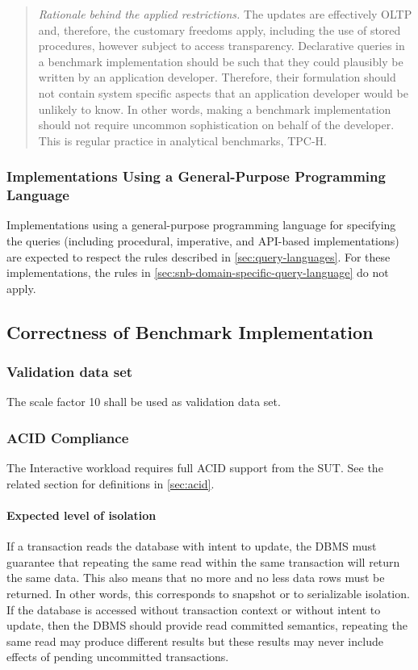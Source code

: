 \begin{quote}
    \emph{Rationale behind the applied restrictions.} The updates are effectively OLTP and, therefore, the customary freedoms apply, including the use of stored procedures, however subject to access transparency. Declarative queries in a benchmark implementation should be such that they could plausibly be written by an application developer. Therefore, their formulation should not contain system specific aspects that an application developer would be unlikely to know. In other words, making a benchmark implementation should not require uncommon sophistication on behalf of the developer. This is regular practice in analytical benchmarks, \eg TPC-H.
\end{quote}

\subsubsection{Implementations Using a General-Purpose Programming Language}
\label{sec:snb-general-purpose-programming-language}

Implementations using a general-purpose programming language for specifying the queries (including procedural, imperative, and API-based implementations) are expected to respect the rules described in \autoref{sec:query-languages}.
For these implementations, the rules in \autoref{sec:snb-domain-specific-query-language} do not apply.

\subsection{Correctness of Benchmark Implementation}

\subsubsection{Validation data set}
\label{sec:validation-data-set}
The scale factor 10 shall be used as validation data set.

\subsubsection{ACID Compliance}
\label{sec:snb-acid}

The Interactive workload requires full ACID support from the SUT.
See the related section for definitions in \autoref{sec:acid}.

\paragraph{Expected level of isolation}
If a transaction reads the database with intent to update, the DBMS must guarantee that repeating the same read within the same transaction will return the same data. This also means that no more and no less data rows must be returned. In other words, this corresponds to snapshot or to serializable isolation. If the database is accessed without transaction context or without intent to update, then the DBMS should provide read committed semantics, \eg repeating the same read may produce different results but these results may never include effects of pending uncommitted transactions.

